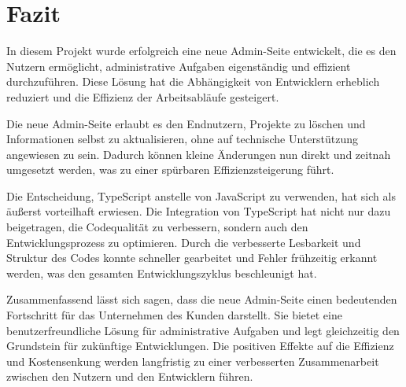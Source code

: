 \section{Fazit}
In diesem Projekt wurde erfolgreich eine neue Admin-Seite entwickelt, die es den Nutzern ermöglicht, administrative Aufgaben eigenständig und effizient durchzuführen.
Diese Lösung hat die Abhängigkeit von Entwicklern erheblich reduziert und die Effizienz der Arbeitsabläufe gesteigert.

Die neue Admin-Seite erlaubt es den Endnutzern, Projekte zu löschen und Informationen selbst zu aktualisieren, ohne auf technische Unterstützung angewiesen zu sein.
Dadurch können kleine Änderungen nun direkt und zeitnah umgesetzt werden, was zu einer spürbaren Effizienzsteigerung führt.

Die Entscheidung, TypeScript anstelle von JavaScript zu verwenden, hat sich als äußerst vorteilhaft erwiesen.
Die Integration von TypeScript hat nicht nur dazu beigetragen, die Codequalität zu verbessern, sondern auch den Entwicklungsprozess zu optimieren.
Durch die verbesserte Lesbarkeit und Struktur des Codes konnte schneller gearbeitet und Fehler frühzeitig erkannt werden, was den gesamten Entwicklungszyklus beschleunigt hat.

Zusammenfassend lässt sich sagen, dass die neue Admin-Seite einen bedeutenden Fortschritt für das Unternehmen des Kunden darstellt.
Sie bietet eine benutzerfreundliche Lösung für administrative Aufgaben und legt gleichzeitig den Grundstein für zukünftige Entwicklungen.
Die positiven Effekte auf die Effizienz und Kostensenkung werden langfristig zu einer verbesserten Zusammenarbeit zwischen den Nutzern und den Entwicklern führen.